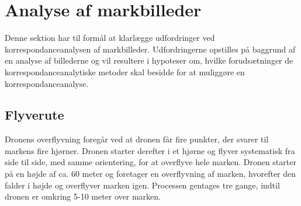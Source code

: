 \chapter{Analyse af markbilleder} \label{sec:mark}
Denne sektion har til formål at klarlægge udfordringer ved korrespondanceanalysen af markbilleder. Udfordringerne opstilles på baggrund af en analyse af billederne og vil resultere i hypoteser om, hvilke forudsætninger de korrespondanceanalytiske metoder skal besidde for at muliggøre en korrespondanceanalyse.
\section{Flyverute}
Dronens overflyvning foregår ved at dronen får fire punkter, der svarer til markens fire hjørner. Dronen starter derefter i et hjørne og flyver systematisk fra side til side, med samme orientering, for at overflyve hele marken. Dronen starter på en højde af ca. 60 meter og foretager en overflyvning af marken, hvorefter den falder i højde og overflyver marken igen. Processen gentages tre gange, indtil dronen er omkring 5-10 meter over marken. 

